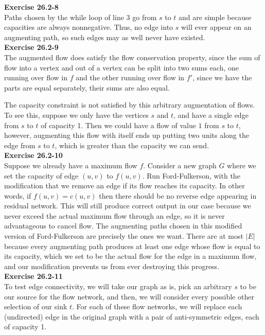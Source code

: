 \documentclass{article}
\begin{document}
\noindent\textbf{Exercise 26.2-8}\\

Paths chosen by the while loop of line 3 go from $s$ to $t$ and are simple because capacities are always nonnegative.  Thus, no edge into $s$ will ever appear on an augmenting path, so such edges may as well never have existed. \\

\noindent\textbf{Exercise 26.2-9}\\

The augmented flow does satisfy the flow conservation property, since the sum of flow into a vertex and out of a vertex can be split into two sums each, one running over flow in $f$ and the other running over flow in $f'$, since we have the parts are equal separately, their sums are also equal.

The capacity constraint is not satisfied by this arbitrary augmentation of flows. To see this, suppose we only have the vertices $s$ and $t$, and have a single edge from $s$ to $t$ of capacity 1. Then we could have a flow of value $1$ from $s$ to $t$, however, augmenting this flow with itself ends up putting two units along the edge from $s$ to $t$, which is greater than the capacity we can send.\\

\noindent\textbf{Exercise 26.2-10}\\ 

Suppose we already have a maximum flow $f$.   Consider a new graph $G$ where we set the capacity of edge $(u,v)$ to $f(u,v)$.  Run Ford-Fulkerson, with the modification that we remove an edge if its flow reaches its capacity.  In other words, if $f(u,v) = c(u,v)$ then there should be no reverse edge appearing in residual network.  This will still produce correct output in our case because we never exceed the actual maximum flow through an edge, so it is never advantageous to cancel flow.  The augmenting paths chosen in this modified version of Ford-Fulkerson are precisely the ones we want.  There are at most $|E|$ because every augmenting path produces at least one edge whose flow is equal to its capacity, which we set to be the actual flow for the edge in a maximum flow, and our modification prevents us from ever destroying this progress. \\

\noindent\textbf{Exercise 26.2-11}\\

To test edge connectivity, we will take our graph as is, pick an arbitrary $s$ to be our source for the flow network, and then, we will consider every possible other selection of our sink $t$. For each of these flow networks, we will replace each (undirected) edge in the original graph with a pair of anti-symmetric edges, each of capacity 1. 
\end{document}
